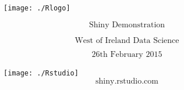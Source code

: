 \documentclass{beamer}
\begin{document}
\begin{frame}
\begin{figure}
\vspace{1cm}
\centering
\texttt{[image: ./Rlogo]}

\end{figure}
\LARGE
\[ \mbox{Shiny Demonstration}  \]

\[ \mbox{West of Ireland Data Science}  \]
\Large


\[ \mbox{26th February 2015}  \]
\end{frame}
\begin{frame}
\begin{figure}
\Large
\centering
\texttt{[image: ./Rstudio]}
\[ \mbox{shiny.rstudio.com}  \]
\end{figure}

\end{frame}
\end{document}

